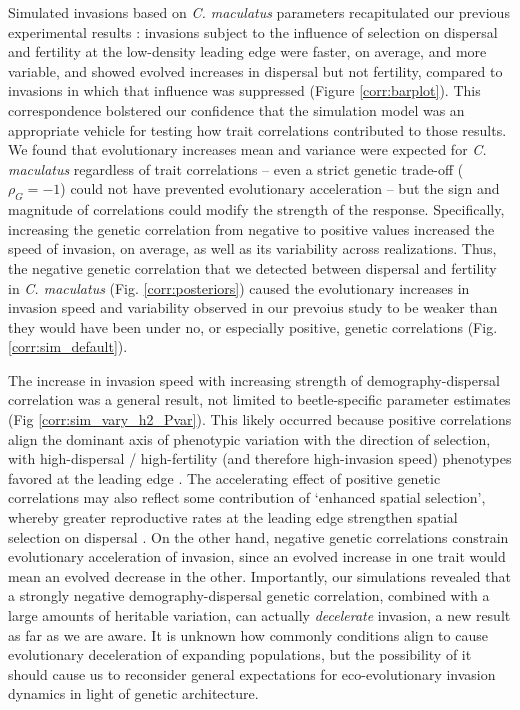 \documentclass[11pt]{article}
\begin{document}
Simulated invasions based on \textit{C. maculatus} parameters recapitulated our previous experimental results \citep{ochocki_rapid_2017}: invasions subject to the influence of selection on dispersal and fertility at the low-density leading edge were faster, on average, and more variable, and showed evolved increases in dispersal but not fertility, compared to invasions in which that influence was suppressed (Figure \ref{corr:barplot}).
This correspondence bolstered our confidence that the simulation model was an appropriate vehicle for testing how trait correlations contributed to those results.
We found that evolutionary increases mean and variance were expected for \textit{C. maculatus} regardless of trait correlations -- even a strict genetic trade-off ($\rho_{G} = -1$) could not have prevented evolutionary acceleration -- but the sign and magnitude of correlations could modify the strength of the response.
Specifically, increasing the genetic correlation from negative to positive values increased the speed of invasion, on average, as well as its variability across realizations.
Thus, the negative genetic correlation that we detected between dispersal and fertility in \textit{C. maculatus} (Fig. \ref{corr:posteriors}) caused the evolutionary increases in invasion speed and variability observed in our prevoius study to be weaker than they would have been under no, or especially positive, genetic correlations (Fig. \ref{corr:sim_default}).

The increase in invasion speed with increasing strength of demography-dispersal correlation was a general result, not limited to beetle-specific parameter estimates (Fig \ref{corr:sim_vary_h2_Pvar}).
This likely occurred because positive correlations align the dominant axis of phenotypic variation with the direction of selection, with high-dispersal / high-fertility (and therefore high-invasion speed) phenotypes favored at the leading edge \citep{phillips_life-history_2010}.
The accelerating effect of positive genetic correlations may also reflect some contribution of `enhanced spatial selection', whereby greater reproductive rates at the leading edge strengthen spatial selection on dispersal \citep{perkins_evolution_2013}.
On the other hand, negative genetic correlations constrain evolutionary acceleration of invasion, since an evolved increase in one trait would mean an evolved decrease in the other.
Importantly, our simulations revealed that a strongly negative demography-dispersal genetic correlation, combined with a large amounts of heritable variation, can actually \textit{decelerate} invasion, a new result as far as we are aware.
It is unknown how commonly conditions align to cause evolutionary deceleration of expanding populations, but the possibility of it should cause us to reconsider general expectations for eco-evolutionary invasion dynamics in light of genetic architecture.
\end{document}
